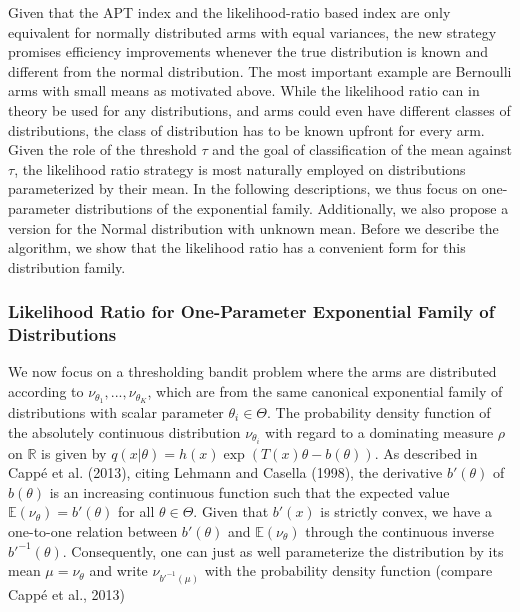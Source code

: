 \documentclass[11pt,]{article}
\begin{document}
Given that the APT index and the likelihood-ratio based index are only
equivalent for normally distributed arms with equal variances, the new
strategy promises efficiency improvements whenever the true distribution
is known and different from the normal distribution. The most important
example are Bernoulli arms with small means as motivated above. While
the likelihood ratio can in theory be used for any distributions, and
arms could even have different classes of distributions, the class of
distribution has to be known upfront for every arm. Given the role of
the threshold \(\tau\) and the goal of classification of the mean
against \(\tau\), the likelihood ratio strategy is most naturally
employed on distributions parameterized by their mean. In the following
descriptions, we thus focus on one-parameter distributions of the
exponential family. Additionally, we also propose a version for the
Normal distribution with unknown mean. Before we describe the algorithm,
we show that the likelihood ratio has a convenient form for this
distribution family.

\subsubsection{\texorpdfstring{Likelihood Ratio for One-Parameter
Exponential Family of Distributions
\label{sec:LRforUnivariateExponentialFamily}}{Likelihood Ratio for One-Parameter Exponential Family of Distributions }}\label{likelihood-ratio-for-one-parameter-exponential-family-of-distributions}

We now focus on a thresholding bandit problem where the arms are
distributed according to \(\nu_{\theta_1}, ..., \nu_{\theta_K}\), which
are from the same canonical exponential family of distributions with
scalar parameter \(\theta_i \in \Theta\). The probability density
function of the absolutely continuous distribution \(\nu_{\theta_i}\)
with regard to a dominating measure \(\rho\) on \(\mathbb{R}\) is given
by \(q(x|\theta) = h(x) \exp(T(x)\theta - b(\theta))\). As described in
Cappé et al. (2013), citing Lehmann and Casella (1998), the derivative
\(b'(\theta)\) of \(b(\theta)\) is an increasing continuous function
such that the expected value \(\mathbb{E}(\nu_{\theta}) = b'(\theta)\)
for all \(\theta \in \Theta\). Given that \(b'(x)\) is strictly convex,
we have a one-to-one relation between \(b'(\theta)\) and
\(\mathbb{E}(\nu_{\theta})\) through the continuous inverse
\(b'^{-1}(\theta)\). Consequently, one can just as well parameterize the
distribution by its mean \(\mu = \mathbb{\nu_{\theta}}\) and write
\(\nu_{b'^{-1}(\mu)}\) with the probability density function (compare
Cappé et al., 2013)
\end{document}
